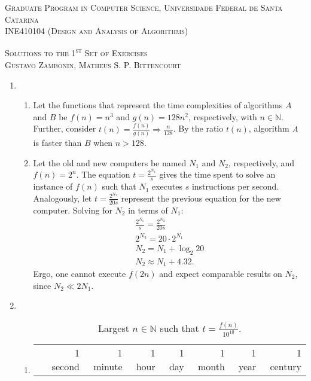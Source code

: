 \documentclass[12pt]{article}
\begin{document}
\textsc{Graduate Program in Computer Science,
  Universidade Federal de Santa Catarina} \\
\textsc{INE410104 (Design and Analysis of Algorithms)}

\textsc{Solutions to the 1\textsuperscript{st} Set of Exercises} \\
\textsc{Gustavo Zambonin, Matheus S. P. Bittencourt}

\begin{enumerate}
    \item 
    \begin{enumerate}
        \item Let the functions that represent the time complexities of algorithms $A$ and $B$ be $f(n) = n^{3}$ and $g(n) = 128n^{2}$, respectively, with $n \in \mathbb{N}$. Further, consider $t(n) = \frac{f(n)}{g(n)} \Rightarrow \frac{n}{128}$. By the ratio $t(n)$, algorithm $A$ is faster than $B$ when $n > 128$.
        \item Let the old and new computers be named $N_{1}$ and $N_{2}$, respectively, and $f(n) = 2^{n}$. The equation $t = \frac{2^{N_{1}}}{s}$ gives the time spent to solve an instance of $f(n)$ such that $N_{1}$ executes $s$ instructions per second. Analogously, let $t = \frac{2^{N_{2}}}{20s}$ represent the previous equation for the new computer. Solving for $N_{2}$ in terms of $N_{1}$:
        \begin{align*}
            \frac{2^{N_{1}}}{s} = \frac{2^{N_{2}}}{20s} \\
            2^{N_{2}} = 20 \cdot 2^{N_{1}} \\
            N_{2} = N_{1} + \log_{2} 20 \\
            N_{2} \approx N_{1} + 4.32.
        \end{align*}
        Ergo, one cannot execute $f(2n)$ and expect comparable results on $N_{2}$, since $N_{2} \ll 2 N_{1}$.
    \end{enumerate}
    \item
    \begin{enumerate}
        \item
        \begin{table}[htbp]
            \renewcommand{\arraystretch}{1.2}
            \setlength{\tabcolsep}{7pt}
            \centering
            \caption{Largest $n \in \mathbb{N}$ such that $t = \frac{f(n)}{10^{10}}$.}
            \begin{tabular}{l*{7}{r}}
                \toprule
                    & 1 second & 1 minute & 1 hour & 1 day & 1 month & 1 year & 1 century \\

\end{tabular}
\end{table}
\end{enumerate}
\end{enumerate}
\end{document}

